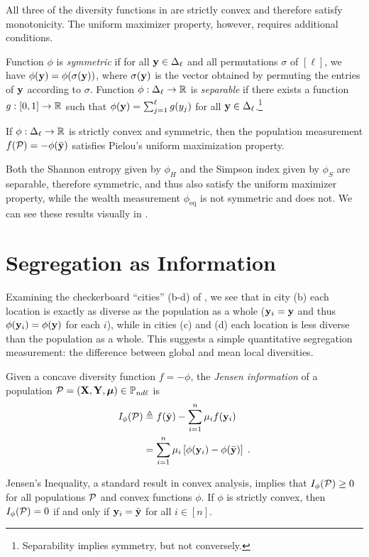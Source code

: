 All three of the diversity functions in  are strictly convex and therefore satisfy monotonicity.
The uniform maximizer property, however, requires additional conditions. 
  \begin{dfn}
    Function $\phi$ is \emph{symmetric} if for all $\mathbf{y} \in \Delta_{\ell}$ and all permutations $\sigma$ of $[\ell]$, we have $\phi(\mathbf{y}) = \phi(\sigma(\mathbf{y}))$, where $\sigma(\mathbf{y})$ is the vector obtained by permuting the entries of $\mathbf{y}$ according to $\sigma$.
    Function $\phi: \Delta_{\ell} \rightarrow \mathbb{R}$ is \emph{separable} if there exists a function $g: [0, 1] \rightarrow \mathbb{R}$ such that $\phi(\mathbf{y}) = \sum_{j = 1}^{\ell} g(y_j)$ for all $\mathbf{y} \in \Delta_{\ell}$.\footnote{Separability implies symmetry, but not conversely.}
  \end{dfn}

  \begin{thm}\label{thm:diversity-axioms-1}
    If $\phi: \Delta_{\ell} \rightarrow \mathbb{R}$ is strictly convex and symmetric, then the population measurement $f(\mathcal{P}) = -\phi(\bar{\mathbf{y}})$ satisfies Pielou's uniform maximization property.
  \end{thm}
  Both the Shannon entropy given by $\phi_{H}$ and the Simpson index given by $\phi_{S}$ are separable, therefore symmetric, and thus also satisfy the uniform maximizer property, while the wealth measurement $\phi_{\mathrm{eq}}$ is not symmetric and does not.
  We can see these results visually in . 
  

\section{Segregation as Information} \label{sec:segregation}


Examining the checkerboard ``cities'' (b-d) of , we see that in city (b) each location is exactly as diverse as the population as a whole ($\mathbf{y}_i = \mathbf{y}$ and thus $\phi(\mathbf{y}_i) = \phi(\mathbf{y})$ for each $i$), while in cities (c) and (d) each location is less diverse than the population as a whole.
This suggests a simple quantitative segregation measurement: the difference between global and mean local diversities. 
\begin{dfn}
  Given a concave diversity function $f = -\phi$,  the \emph{Jensen information}  of a population $\mathcal{P} = (\mathbf{X}, \mathbf{Y}, \boldsymbol{\mu}) \in \mathbb{P}_{nd\ell}$ is
  \begin{align}
    I_{\phi}(\mathcal{P}) &\triangleq f(\bar{\mathbf{y}}) - \sum_{i = 1}^n \mu_i f(\mathbf{y}_i) \nonumber \\ 
    &= \sum_{i = 1}^n \mu_i \left[ \phi(\mathbf{y}_i) - \phi(\bar{\mathbf{y}}) \right] \;.  \label{eq:jensen-information}
  \end{align}
\end{dfn}
Jensen's Inequality, a standard result in convex analysis, implies that $I_{\phi}(\mathcal{P}) \geq 0$ for all populations $\mathcal{P}$ and convex functions $\phi$. 
If $\phi$ is strictly convex, then $I_{\phi}(\mathcal{P}) = 0$ if and only if $\mathbf{y}_i = \bar{\mathbf{y}}$ for all $i \in [n]$.

